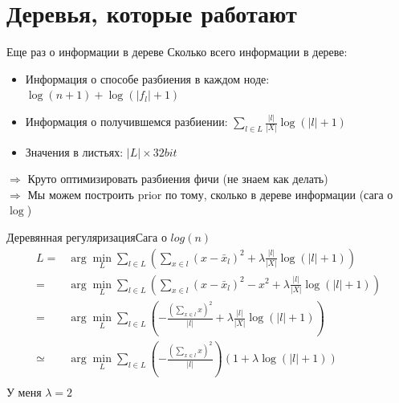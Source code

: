 \documentclass[14pt, fleqn, xcolor={dvipsnames, table}]{beamer}
\begin{document}
\section{Деревья, которые работают}

\begin{frame}{Еще раз о информации в дереве}
Сколько всего информации в дереве:
\begin{itemize}
  \item Информация о способе разбиения в каждом ноде: $\log(n + 1) + \log(|f_l| + 1)$
  \item Информация о получившемся разбиении: $\sum_{l \in L} \frac{|l|}{|X|} \log (|l| + 1)$
  \item Значения в листьях: $|L|\times32bit$
\end{itemize}
$\Rightarrow$ Круто оптимизировать разбиения фичи (не знаем как делать) \\
$\Rightarrow$ Мы можем построить prior по тому, сколько в дереве информации (сага о $\log$)
\end{frame}

\begin{frame}{Деревянная регуляризация}{Сага о $log(n)$}
$$\begin{array}{rl}
L =& \arg \min_L \sum_{l \in L} \left(\sum_{x \in l}(x - \bar{x}_l)^2 + \lambda \frac{|l|}{|X|} \log(|l| + 1)\right) \\
= & \arg \min_L \sum_{l \in L} \left(\sum_{x \in l}(x - \bar{x}_l)^2 - x^2+ \lambda \frac{|l|}{|X|} \log(|l| + 1)\right) \\
= & \arg \min_L \sum_{l \in L} \left(- \frac{\left(\sum_{x \in l}x\right)^2}{|l|} + \lambda \frac{|l|}{|X|} \log(|l| + 1)\right) \\
\simeq & \arg \min_L \sum_{l \in L} \left(- \frac{\left(\sum_{x \in l}x\right)^2}{|l|}\right)\left(1 + \lambda \log(|l| + 1)\right) \\
\end{array}$$
У меня $\lambda = 2$
\end{frame}
\end{document}
